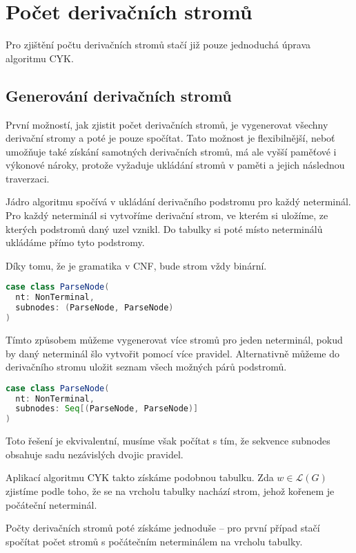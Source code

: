 \documentclass{article}
\begin{document}
\section{Počet derivačních stromů}

Pro zjištění počtu derivačních stromů stačí již pouze jednoduchá
úprava algoritmu CYK.

\subsection{Generování derivačních stromů}

První možností, jak zjistit počet derivačních stromů, je vygenerovat
všechny derivační stromy a poté je pouze spočítat. Tato možnost
je flexibilnější, neboť umožňuje také získání samotných derivačních
stromů, má ale vyšší paměťové i výkonové nároky, protože vyžaduje
ukládání stromů v paměti a jejich následnou traverzaci.

Jádro algoritmu spočívá v ukládání derivačního podstromu pro každý
neterminál. Pro každý neterminál si vytvoříme derivační strom,
ve kterém si uložíme, ze kterých podstromů daný uzel vznikl.
Do tabulky si poté místo neterminálů ukládáme přímo tyto podstromy.

Díky tomu, že je gramatika v CNF, bude strom vždy binární.

\begin{lstlisting}[language=Scala]
case class ParseNode(
  nt: NonTerminal, 
  subnodes: (ParseNode, ParseNode)
)
\end{lstlisting}

Tímto způsobem můžeme vygenerovat více stromů pro jeden neterminál,
pokud by daný neterminál šlo vytvořit pomocí více pravidel. Alternativně
můžeme do derivačního stromu uložit seznam všech možných párů podstromů.

\begin{lstlisting}[language=Scala]
case class ParseNode(
  nt: NonTerminal, 
  subnodes: Seq[(ParseNode, ParseNode)]
)
\end{lstlisting}

Toto řešení je ekvivalentní, musíme však počítat s tím, že sekvence
subnodes obsahuje sadu nezávislých dvojic pravidel.

Aplikací algoritmu CYK takto získáme podobnou tabulku. Zda
$w \in \mathcal{L}(G)$ zjistíme podle toho, že se na vrcholu tabulky
nachází strom, jehož kořenem je počáteční neterminál.

Počty derivačních stromů poté získáme jednoduše -- pro první případ
stačí spočítat počet stromů s počátečním neterminálem na vrcholu tabulky.
\end{document}
